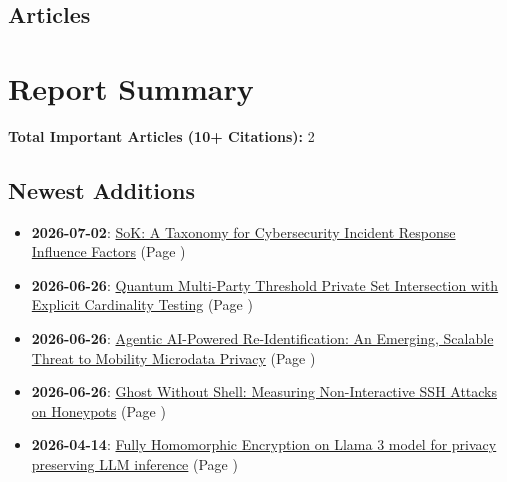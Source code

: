 \documentclass{article}
\date{\today}
\begin{document}
\setlength{\labelcolwidth}{0.2\textwidth} 
\newlength{\contentcolwidth}
\setlength{\contentcolwidth}{0.8\textwidth} 

\subsection*{Articles}

\section*{Report Summary}

\textbf{Total Important Articles (10+ Citations):} 2

\subsection*{Newest Additions}
\begin{itemize}
  \item \textbf{2026-07-02}: \hyperref[sok-a-taxonomy-for-cybersecurity-incident-response-influence-factors]{SoK: A Taxonomy for Cybersecurity Incident Response Influence Factors} (Page \pageref{sok-a-taxonomy-for-cybersecurity-incident-response-influence-factors})
  \item \textbf{2026-06-26}: \hyperref[quantum-multi-party-threshold-private-set-intersection-with-explicit-cardinality-testing]{Quantum Multi-Party Threshold Private Set Intersection with Explicit Cardinality Testing} (Page \pageref{quantum-multi-party-threshold-private-set-intersection-with-explicit-cardinality-testing})
  \item \textbf{2026-06-26}: \hyperref[agentic-ai-powered-re-identification-an-emerging-scalable-threat-to-mobility-microdata-privacy]{Agentic AI-Powered Re-Identification: An Emerging, Scalable Threat to Mobility Microdata Privacy} (Page \pageref{agentic-ai-powered-re-identification-an-emerging-scalable-threat-to-mobility-microdata-privacy})
  \item \textbf{2026-06-26}: \hyperref[ghost-without-shell-measuring-non-interactive-ssh-attacks-on-honeypots]{Ghost Without Shell: Measuring Non-Interactive SSH Attacks on Honeypots} (Page \pageref{ghost-without-shell-measuring-non-interactive-ssh-attacks-on-honeypots})
  \item \textbf{2026-04-14}: \hyperref[fully-homomorphic-encryption-on-llama-3-model-for-privacy-preserving-llm-inference]{Fully Homomorphic Encryption on Llama 3 model for privacy preserving LLM inference} (Page \pageref{fully-homomorphic-encryption-on-llama-3-model-for-privacy-preserving-llm-inference})
\end{itemize}
\end{document}
